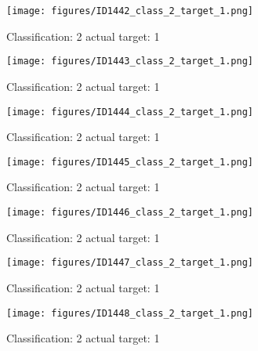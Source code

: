 \begin{figure}[h!]
\begin{center}
\texttt{[image: figures/ID1442\_class\_2\_target\_1.png]}
\end{center}
\caption{ Classification: 2 actual target: 1}
\label{fig:ID1442_class_2_target_1}
\end{figure}
\begin{figure}[h!]
\begin{center}
\texttt{[image: figures/ID1443\_class\_2\_target\_1.png]}
\end{center}
\caption{ Classification: 2 actual target: 1}
\label{fig:ID1443_class_2_target_1}
\end{figure}
\begin{figure}[h!]
\begin{center}
\texttt{[image: figures/ID1444\_class\_2\_target\_1.png]}
\end{center}
\caption{ Classification: 2 actual target: 1}
\label{fig:ID1444_class_2_target_1}
\end{figure}
\begin{figure}[h!]
\begin{center}
\texttt{[image: figures/ID1445\_class\_2\_target\_1.png]}
\end{center}
\caption{ Classification: 2 actual target: 1}
\label{fig:ID1445_class_2_target_1}
\end{figure}
\begin{figure}[h!]
\begin{center}
\texttt{[image: figures/ID1446\_class\_2\_target\_1.png]}
\end{center}
\caption{ Classification: 2 actual target: 1}
\label{fig:ID1446_class_2_target_1}
\end{figure}
\begin{figure}[h!]
\begin{center}
\texttt{[image: figures/ID1447\_class\_2\_target\_1.png]}
\end{center}
\caption{ Classification: 2 actual target: 1}
\label{fig:ID1447_class_2_target_1}
\end{figure}
\begin{figure}[h!]
\begin{center}
\texttt{[image: figures/ID1448\_class\_2\_target\_1.png]}
\end{center}
\caption{ Classification: 2 actual target: 1}
\label{fig:ID1448_class_2_target_1}
\end{figure}
